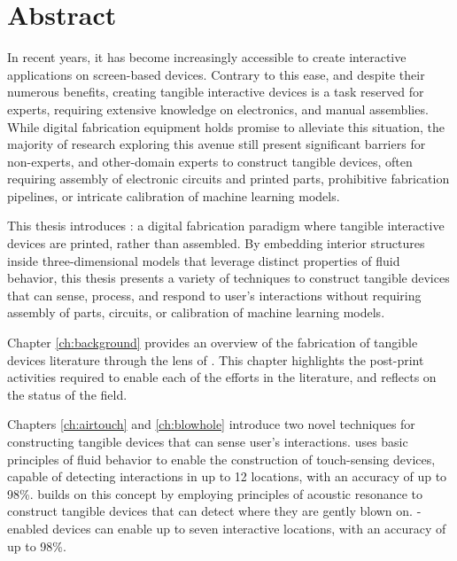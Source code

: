 \begingroup
	\let\clearpage\relax
	\let\cleardoublepage\relax
	\let\cleardoublepage\relax

	\chapter*{Abstract}
		In recent years, it has become increasingly accessible to create interactive
		applications on screen-based devices. Contrary to this ease, and despite
		their numerous benefits, creating tangible interactive devices is a task
		reserved for experts, requiring extensive knowledge on electronics, and
		manual assemblies. While digital fabrication equipment holds promise to
		alleviate this situation, the majority of research exploring this avenue
		still present significant barriers for non-experts, and other-domain experts
		to construct tangible devices, often requiring assembly of electronic
		circuits and printed parts, prohibitive fabrication pipelines, or intricate
		calibration of machine learning models.

		This thesis introduces \emph{\papf}: a digital fabrication paradigm where
		tangible interactive devices are printed, rather than assembled. By
		embedding interior structures inside three-dimensional models that leverage
		distinct properties of fluid behavior, this thesis presents a variety of
		techniques to construct tangible devices that can sense, process, and
		respond to user's interactions without requiring assembly of parts,
		circuits, or calibration of machine learning models.

		Chapter \ref{ch:background} provides an overview of the fabrication of
		tangible devices literature through the lens of \papf. This chapter
		highlights the post-print activities required to enable each of the efforts
		in the literature, and reflects on the status of the field.

		Chapters \ref{ch:airtouch} and \ref{ch:blowhole} introduce two novel
		techniques for constructing tangible devices that can sense user's
		interactions. \at uses basic principles of fluid behavior to enable the
		construction of touch-sensing devices, capable of detecting interactions in
		up to 12 locations, with an accuracy of up to 98\%. \bh builds on this
		concept by employing principles of acoustic resonance to construct tangible
		devices that can detect where they are gently blown on. \bh-enabled devices
		can enable up to seven interactive locations, with an accuracy of up to
		98\%.

